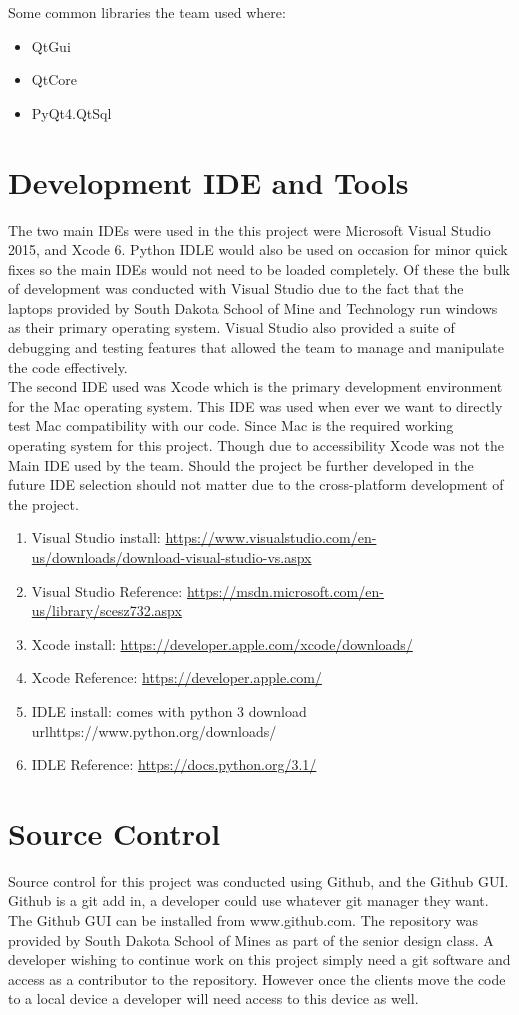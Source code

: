 Some common libraries the team used where:
\begin{itemize}
\item QtGui
\item QtCore
\item PyQt4.QtSql
\end{itemize}



\section{Development IDE and Tools}
The two main IDEs were used in the this project were Microsoft Visual Studio 2015, and Xcode 6. Python IDLE would also be used on occasion for minor quick fixes so the main IDEs would not need to be loaded completely. Of these the bulk of development was conducted with Visual Studio due to the fact that the laptops provided by South Dakota School of Mine and Technology run windows as their primary operating system. Visual Studio also provided a suite of debugging and testing features that allowed the team to manage and manipulate the code effectively.\\
The second IDE used was Xcode which is the primary development environment for the Mac operating system. This IDE was used when ever we want to directly test Mac compatibility with our code. Since Mac is the required working operating system for this project. Though due to accessibility Xcode was not the Main IDE used by the team. Should the project be further developed in the future IDE selection should not matter due to the cross-platform development of the project.

\begin{enumerate}
\item Visual Studio install: \url{https://www.visualstudio.com/en-us/downloads/download-visual-studio-vs.aspx}
\item Visual Studio Reference: \url{https://msdn.microsoft.com/en-us/library/scesz732.aspx}
\item Xcode install: \url{https://developer.apple.com/xcode/downloads/}
\item Xcode Reference: \url{https://developer.apple.com/}
\item IDLE install: comes with python 3 download url{https://www.python.org/downloads/}
\item IDLE Reference: \url{https://docs.python.org/3.1/}
\end{enumerate}

\section{Source  Control}
Source control for this project was conducted using Github, and the Github GUI. Github is a git add in, a developer  
could use whatever git manager they want. The Github GUI can be installed from www.github.com. The repository was provided by South Dakota School of Mines as part of the senior design class. A developer wishing to continue work on this project simply need a git software and access as a contributor to the repository. However once the clients move the code to a local device a developer will need access to this device as well.
 
